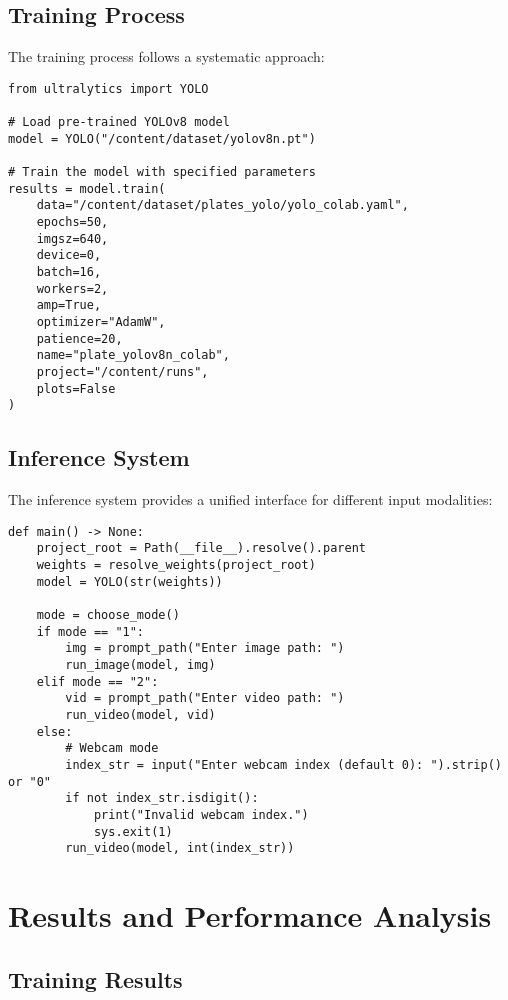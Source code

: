 \documentclass[12pt,a4paper]{article}
\begin{document}
\subsection{Training Process}

The training process follows a systematic approach:

\begin{lstlisting}[caption=Training Implementation]
from ultralytics import YOLO

# Load pre-trained YOLOv8 model
model = YOLO("/content/dataset/yolov8n.pt")

# Train the model with specified parameters
results = model.train(
    data="/content/dataset/plates_yolo/yolo_colab.yaml",
    epochs=50,
    imgsz=640,
    device=0,
    batch=16,
    workers=2,
    amp=True,
    optimizer="AdamW",
    patience=20,
    name="plate_yolov8n_colab",
    project="/content/runs",
    plots=False
)
\end{lstlisting}

\subsection{Inference System}

The inference system provides a unified interface for different input modalities:

\begin{lstlisting}[caption=Main Detection Function]
def main() -> None:
    project_root = Path(__file__).resolve().parent
    weights = resolve_weights(project_root)
    model = YOLO(str(weights))

    mode = choose_mode()
    if mode == "1":
        img = prompt_path("Enter image path: ")
        run_image(model, img)
    elif mode == "2":
        vid = prompt_path("Enter video path: ")
        run_video(model, vid)
    else:
        # Webcam mode
        index_str = input("Enter webcam index (default 0): ").strip() or "0"
        if not index_str.isdigit():
            print("Invalid webcam index.")
            sys.exit(1)
        run_video(model, int(index_str))
\end{lstlisting}

\section{Results and Performance Analysis}

\subsection{Training Results}
\end{document}
